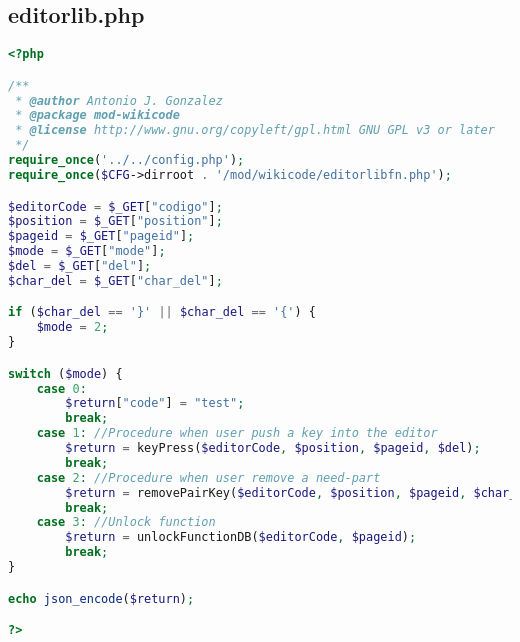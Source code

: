 \subsection{editorlib.php}
\begin{lstlisting}[language=PHP]
<?php

/**
 * @author Antonio J. Gonzalez
 * @package mod-wikicode
 * @license http://www.gnu.org/copyleft/gpl.html GNU GPL v3 or later
 */
require_once('../../config.php');
require_once($CFG->dirroot . '/mod/wikicode/editorlibfn.php');

$editorCode = $_GET["codigo"];
$position = $_GET["position"];
$pageid = $_GET["pageid"];
$mode = $_GET["mode"];
$del = $_GET["del"];
$char_del = $_GET["char_del"];

if ($char_del == '}' || $char_del == '{') {
	$mode = 2;
}

switch ($mode) {
	case 0:
		$return["code"] = "test";
		break;
    case 1: //Procedure when user push a key into the editor
        $return = keyPress($editorCode, $position, $pageid, $del);
        break;
	case 2: //Procedure when user remove a need-part
	    $return = removePairKey($editorCode, $position, $pageid, $char_del);
	    break;
	case 3: //Unlock function
	    $return = unlockFunctionDB($editorCode, $pageid);
	    break;
}

echo json_encode($return);

?>
\end{lstlisting}

